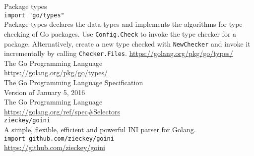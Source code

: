 \documentclass[12pt,letterpaper,dvips]{article}
\begin{document}
\noindent Package types\\
\texttt{import "go/types"}\\
Package types declares the data types and implements
the algorithms for type-checking of Go packages. Use
\texttt{Config.Check} to invoke the type checker for
a package.  Alternatively, create a new type checked
with \texttt{NewChecker} and invoke it incrementally
by calling \texttt{Checker.Files}.
\href{https://golang.org/pkg/go/types/}{https://golang.org/pkg/go/types/}
\\

\noindent The Go Programming Language\\
\href{https://golang.org/pkg/go/types/}{https://golang.org/pkg/go/types/}
\\

\noindent The Go Programming Language Specification\\
Version of January 5, 2016\\
The Go Programming Language\\
\href{https://golang.org/ref/spec\#Selectors}{https://golang.org/ref/spec\#Selectors}
\\


\newpage
\noindent \texttt{zieckey/goini}\\
A simple, flexible, efficient and powerful INI parser for Golang.\\
\texttt{import github.com/zieckey/goini}\\
\href{https://github.com/zieckey/goini}{https://github.com/zieckey/goini}
\end{document}
